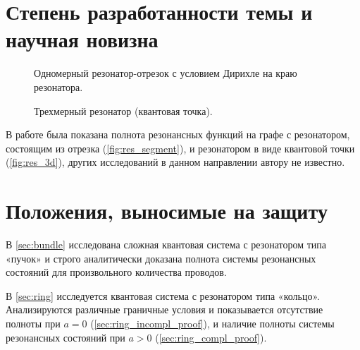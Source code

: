 \section*{Степень разработанности темы и научная новизна}

\begin{figure}[h]
\renewcommand\thefigure{А}
\centering
\begin{tikzpicture}[scale=1.1]

\end{tikzpicture}
\caption{Одномерный резонатор-отрезок с условием Дирихле на краю резонатора.} \label{fig:res_segment}
\end{figure}

\begin{figure}[h]
\renewcommand\thefigure{Б}
\centering
\begin{tikzpicture}[scale=1.1]

\end{tikzpicture}
\caption{Трехмерный резонатор (квантовая точка).} \label{fig:res_3d}
\end{figure}

В работе \cite{spectralpavlov16} была показана полнота резонансных функций на графе с резонатором, состоящим из отрезка (\autoref{fig:res_segment}), и резонатором в виде квантовой точки (\autoref{fig:res_3d}), других исследований в данном направлении автору не известно.

\section*{Положения, выносимые на защиту}
В \autoref{sec:bundle} исследована сложная квантовая система с резонатором типа «пучок» и строго аналитически доказана полнота системы резонансных состояний для произвольного количества проводов.

В \autoref{sec:ring} исследуется квантовая система с резонатором типа «кольцо». Анализируются различные граничные условия и показывается отсутствие полноты при $a = 0$ (\autoref{sec:ring_incompl_proof}), и наличие полноты системы резонансных состояний при $a > 0$ (\autoref{sec:ring_compl_proof}). 